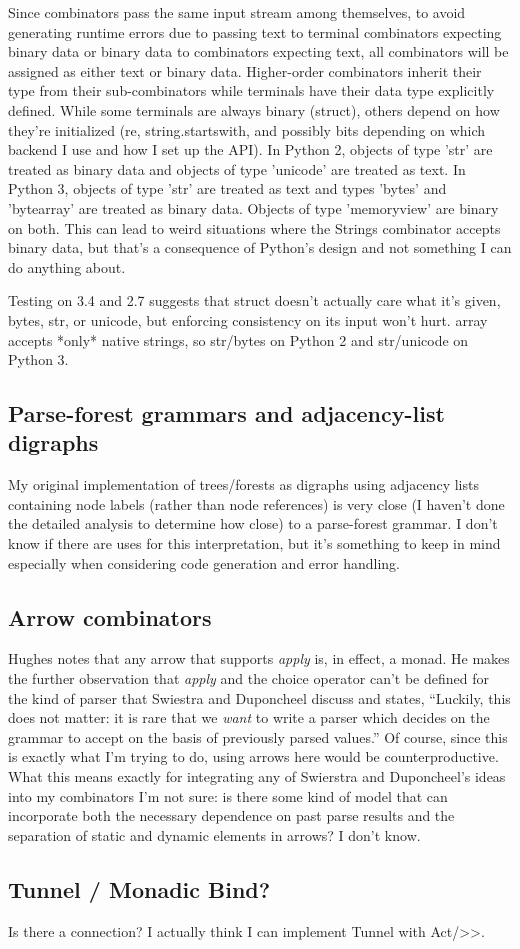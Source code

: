 \documentclass[12pt]{article}
\begin{document}
Since combinators pass the same input stream among themselves, to
avoid generating runtime errors due to passing text to terminal
combinators expecting binary data or binary data to combinators
expecting text, all combinators will be assigned as either text or
binary data.  Higher-order combinators inherit their type from their
sub-combinators while terminals have their data type explicitly
defined.  While some terminals are always binary (struct), others
depend on how they're initialized (re, string.startswith, and possibly
bits depending on which backend I use and how I set up the API).  In
Python 2, objects of type 'str' are treated as binary data and objects
of type 'unicode' are treated as text.  In Python 3, objects of type
'str' are treated as text and types 'bytes' and 'bytearray' are
treated as binary data.  Objects of type 'memoryview' are binary on
both.  This can lead to weird situations where the Strings combinator
accepts binary data, but that's a consequence of Python's design and
not something I can do anything about.

Testing on 3.4 and 2.7 suggests that struct doesn't actually care what
it's given, bytes, str, or unicode, but enforcing consistency on its
input won't hurt.  array accepts *only* native strings, so str/bytes
on Python 2 and str/unicode on Python 3.


\subsection{Parse-forest grammars and adjacency-list digraphs}
\label{sec:parse-forest_grammars_adjacency-list_digraphs}

My original implementation of trees/forests as digraphs using
adjacency lists containing node labels (rather than node references)
is very close (I haven't done the detailed analysis to determine how
close) to a parse-forest grammar.  I don't know if there are uses for
this interpretation, but it's something to keep in mind especially
when considering code generation and error handling.


\subsection{Arrow combinators}
\label{sec:arrow_combinators}

Hughes notes that any arrow that supports \emph{apply} is, in effect,
a monad.  He makes the further observation that \emph{apply} and the
choice operator can't be defined for the kind of parser that Swiestra
and Duponcheel discuss and states, ``Luckily, this does not matter: it
is rare that we \emph{want} to write a parser which decides on the
grammar to accept on the basis of previously parsed values.''  Of
course, since this is exactly what I'm trying to do, using arrows here
would be counterproductive.  What this means exactly for integrating
any of Swierstra and Duponcheel's ideas into my combinators I'm not
sure: is there some kind of model that can incorporate both the
necessary dependence on past parse results and the separation of
static and dynamic elements in arrows?  I don't know.


\subsection{Tunnel / Monadic Bind?}
\label{sec:tunnel_bind}

Is there a connection?  I actually think I can implement Tunnel with
Act/>>.



\printbibliography
\end{document}
